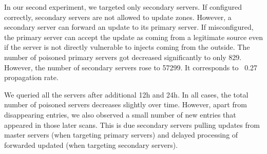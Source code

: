 In our second experiment, we targeted only secondary servers. If configured correctly, secondary servers are not allowed to update zones. However, a secondary server can forward an update to its primary server. If misconfigured, the primary server can accept the update as coming from a legitimate source even if the server is not directly vulnerable to injects coming from the outside.  The number of poisoned primary servers got decreased significantly to only 829. However, the number of secondary servers rose to 57299. It corresponds to ~0.27 propagation rate. 

We queried all the servers after additional 12h and 24h. In all cases, the total number of poisoned servers decreases slightly over time. However, apart from disappearing entries, we also observed a small number of new entries that appeared in those later scans. This is due secondary servers pulling updates from master servers (when targeting primary servers) and delayed processing of forwarded updated (when targeting secondary servers). 
